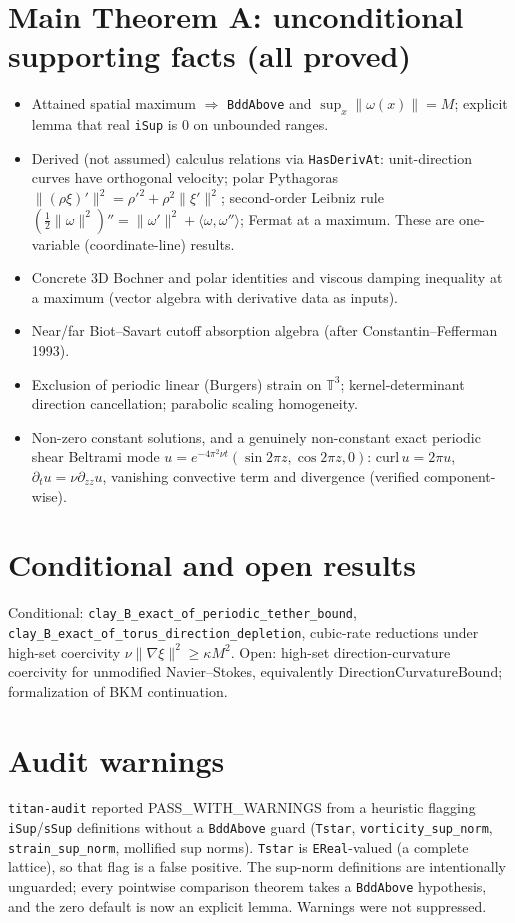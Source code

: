 \documentclass[11pt]{article}
\begin{document}
\section{Main Theorem A: unconditional supporting facts (all proved)}
\begin{itemize}
\item Attained spatial maximum $\Rightarrow$ \texttt{BddAbove} and $\sup_x\|\omega(x)\|=M$; explicit lemma that real \texttt{iSup} is $0$ on unbounded ranges.
\item Derived (not assumed) calculus relations via \texttt{HasDerivAt}: unit-direction curves have orthogonal velocity; polar Pythagoras $\|(\rho\xi)'\|^2=\rho'^2+\rho^2\|\xi'\|^2$; second-order Leibniz rule $(\tfrac12\|\omega\|^2)''=\|\omega'\|^2+\langle\omega,\omega''\rangle$; Fermat at a maximum. These are one-variable (coordinate-line) results.
\item Concrete 3D Bochner and polar identities and viscous damping inequality at a maximum (vector algebra with derivative data as inputs).
\item Near/far Biot--Savart cutoff absorption algebra (after Constantin--Fefferman 1993).
\item Exclusion of periodic linear (Burgers) strain on $\mathbb{T}^3$; kernel-determinant direction cancellation; parabolic scaling homogeneity.
\item Non-zero constant solutions, and a genuinely non-constant exact periodic shear Beltrami mode $u=e^{-4\pi^2\nu t}(\sin2\pi z,\cos2\pi z,0)$: $\mathrm{curl}\,u=2\pi u$, $\partial_tu=\nu\partial_{zz}u$, vanishing convective term and divergence (verified component-wise).
\end{itemize}
\section{Conditional and open results}
Conditional: \texttt{clay\_B\_exact\_of\_periodic\_tether\_bound}, \texttt{clay\_B\_exact\_of\_torus\_direction\_depletion}, cubic-rate reductions under high-set coercivity $\nu\|\nabla\xi\|^2\ge\kappa M^2$. Open: high-set direction-curvature coercivity for unmodified Navier--Stokes, equivalently $\mathrm{DirectionCurvatureBound}$; formalization of BKM continuation.
\section{Audit warnings}
\texttt{titan-audit} reported PASS\_WITH\_WARNINGS from a heuristic flagging \texttt{iSup}/\texttt{sSup} definitions without a \texttt{BddAbove} guard (\texttt{Tstar}, \texttt{vorticity\_sup\_norm}, \texttt{strain\_sup\_norm}, mollified sup norms). \texttt{Tstar} is \texttt{EReal}-valued (a complete lattice), so that flag is a false positive. The sup-norm definitions are intentionally unguarded; every pointwise comparison theorem takes a \texttt{BddAbove} hypothesis, and the zero default is now an explicit lemma. Warnings were not suppressed.
\end{document}
